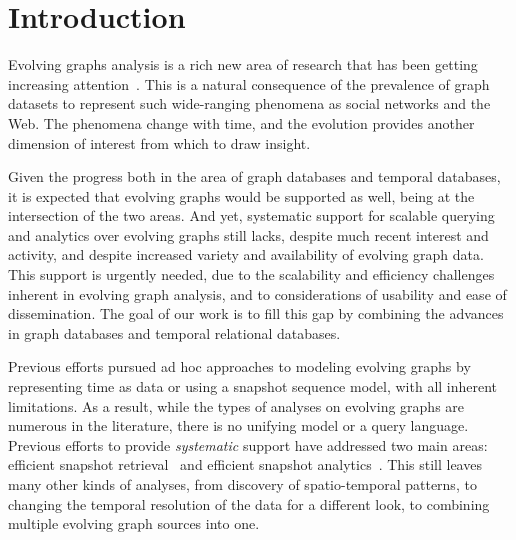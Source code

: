 \section{Introduction}
\label{sec:intro}

Evolving graphs analysis is a rich new area of research that has been
getting increasing
attention~\cite{DBLP:journals/csur/AggarwalS14,Miao2015,Ren2011,Semertzidis2015}.
This is a natural consequence of the prevalence of graph datasets to
represent such wide-ranging phenomena as social networks and the Web.
The phenomena change with time, and the evolution provides another
dimension of interest from which to draw insight.

Given the progress both in the area of graph databases and temporal
databases, it is expected that evolving graphs would be supported as
well, being at the intersection of the two areas.  And yet, systematic
support for scalable querying and analytics over evolving graphs still
lacks, despite much recent interest and activity, and despite increased
variety and availability of evolving graph data.  This support is
urgently needed, due to the scalability and efficiency challenges
inherent in evolving graph analysis, and to considerations of
usability and ease of dissemination.  The goal of our work is to fill
this gap by combining the advances in graph databases and temporal
relational databases.

Previous efforts pursued ad hoc approaches to modeling evolving graphs
by representing time as data or using a snapshot sequence model, with
all inherent limitations.  As a result, while the types of analyses on
evolving graphs are numerous in the literature, there is no unifying
model or a query language.  Previous efforts to provide {\em
  systematic} support have addressed two main areas: efficient
snapshot retrieval~\cite{Khurana2013,Khurana2016} and efficient
snapshot analytics~\cite{Miao2015,MoffittTempWeb16}.  This still
leaves many other kinds of analyses, from discovery of spatio-temporal
patterns, to changing the temporal resolution of the data for a
different look, to combining multiple evolving graph sources into one.


